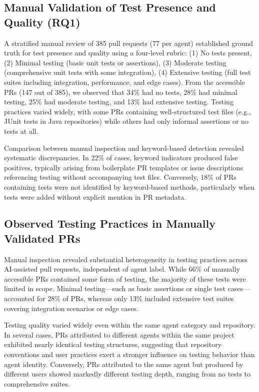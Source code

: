 \documentclass[conference]{IEEEtran}
\begin{document}
\subsection{Manual Validation of Test Presence and Quality (RQ1)}
A stratified manual review of 385 pull requests (77 per agent) established ground truth for test presence and quality using a four-level rubric: (1) No tests present, (2) Minimal testing (basic unit tests or assertions), (3) Moderate testing (comprehensive unit tests with some integration), (4) Extensive testing (full test suites including integration, performance, and edge cases). From the accessible PRs (147 out of 385), we observed that 34\% had no tests, 28\% had minimal testing, 25\% had moderate testing, and 13\% had extensive testing. Testing practices varied widely, with some PRs containing well-structured test files (e.g., JUnit tests in Java repositories) while others had only informal assertions or no tests at all.

Comparison between manual inspection and keyword-based detection revealed systematic discrepancies. In 22\% of cases, keyword indicators produced false positives, typically arising from boilerplate PR templates or issue descriptions referencing testing without accompanying test files. Conversely, 18\% of PRs containing tests were not identified by keyword-based methods, particularly when tests were added without explicit mention in PR metadata.

\subsection{Observed Testing Practices in Manually Validated PRs}

Manual inspection revealed substantial heterogeneity in testing practices across AI-assisted pull requests, independent of agent label. While 66\% of manually accessible PRs contained some form of testing, the majority of these tests were limited in scope. Minimal testing—such as basic assertions or single test cases—accounted for 28\% of PRs, whereas only 13\% included extensive test suites covering integration scenarios or edge cases.

Testing quality varied widely even within the same agent category and repository. In several cases, PRs attributed to different agents within the same project exhibited nearly identical testing structures, suggesting that repository conventions and user practices exert a stronger influence on testing behavior than agent identity. Conversely, PRs attributed to the same agent but produced by different users showed markedly different testing depth, ranging from no tests to comprehensive suites.
\end{document}
